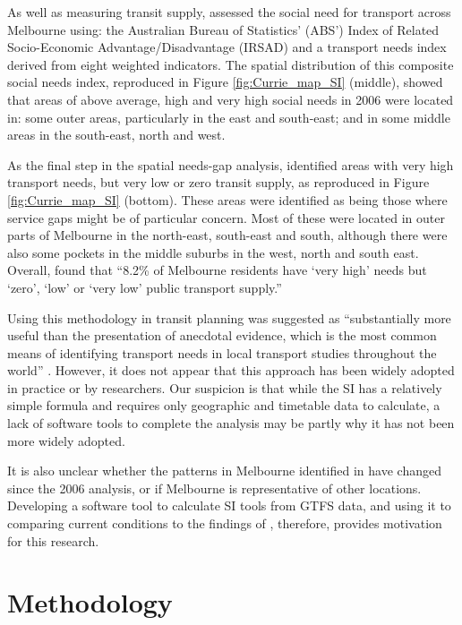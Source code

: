 \documentclass[preprint, 3p,
authoryear]{elsarticle} %
\begin{document}
As well as measuring transit supply, \citet{currie2010identifying}
assessed the social need for transport across Melbourne using: the
Australian Bureau of Statistics' (ABS') Index of Related Socio-Economic
Advantage/Disadvantage (IRSAD) and a transport needs index derived from
eight weighted indicators. The spatial distribution of this composite
social needs index, reproduced in Figure \ref{fig:Currie_map_SI}
(middle), showed that areas of above average, high and very high social
needs in 2006 were located in: some outer areas, particularly in the
east and south-east; and in some middle areas in the south-east, north
and west.

As the final step in the spatial needs-gap analysis,
\citet{currie2010identifying} identified areas with very high transport
needs, but very low or zero transit supply, as reproduced in Figure
\ref{fig:Currie_map_SI} (bottom). These areas were identified as being
those where service gaps might be of particular concern. Most of these
were located in outer parts of Melbourne in the north-east, south-east
and south, although there were also some pockets in the middle suburbs
in the west, north and south east. Overall,
\citet{currie2010identifying} found that ``8.2\% of Melbourne residents
have `very high' needs but `zero', `low' or `very low' public transport
supply.''

Using this methodology in transit planning was suggested as
``substantially more useful than the presentation of anecdotal evidence,
which is the most common means of identifying transport needs in local
transport studies throughout the world'' \citep{currie2010identifying}.
However, it does not appear that this approach has been widely adopted
in practice or by researchers. Our suspicion is that while the SI has a
relatively simple formula and requires only geographic and timetable
data to calculate, a lack of software tools to complete the analysis may
be partly why it has not been more widely adopted.

It is also unclear whether the patterns in Melbourne identified in
\citet{currie2010identifying} have changed since the 2006 analysis, or
if Melbourne is representative of other locations. Developing a software
tool to calculate SI tools from GTFS data, and using it to comparing
current conditions to the findings of \citet{currie2010identifying},
therefore, provides motivation for this research.

\section{Methodology}\label{methodology}
\end{document}
